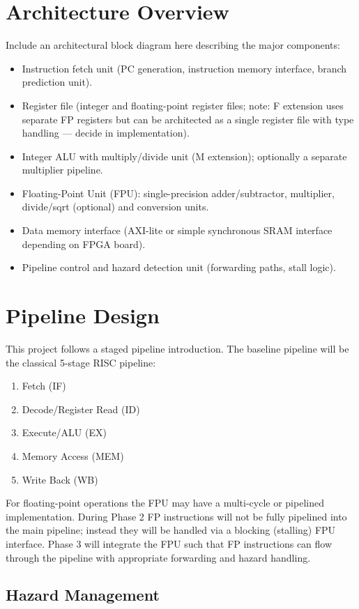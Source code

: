 \documentclass[11pt,a4paper]{article}
\begin{document}
\section{Architecture Overview}
Include an architectural block diagram here describing the major components:
\begin{itemize}
\item Instruction fetch unit (PC generation, instruction memory interface, branch prediction unit).
\item Register file (integer and floating-point register files; note: F extension uses separate FP registers but can be architected as a single register file with type handling — decide in implementation).
\item Integer ALU with multiply/divide unit (M extension); optionally a separate multiplier pipeline.
\item Floating-Point Unit (FPU): single-precision adder/subtractor, multiplier, divide/sqrt (optional) and conversion units.
\item Data memory interface (AXI-lite or simple synchronous SRAM interface depending on FPGA board).
\item Pipeline control and hazard detection unit (forwarding paths, stall logic).
\end{itemize}

\section{Pipeline Design}
This project follows a staged pipeline introduction. The baseline pipeline will be the classical 5-stage RISC pipeline:
\begin{enumerate}
\item Fetch (IF)
\item Decode/Register Read (ID)
\item Execute/ALU (EX)
\item Memory Access (MEM)
\item Write Back (WB)
\end{enumerate}

For floating-point operations the FPU may have a multi-cycle or pipelined implementation. During Phase 2 FP instructions will not be fully pipelined into the main pipeline; instead they will be handled via a blocking (stalling) FPU interface. Phase 3 will integrate the FPU such that FP instructions can flow through the pipeline with appropriate forwarding and hazard handling.

\subsection{Hazard Management}
\end{document}
